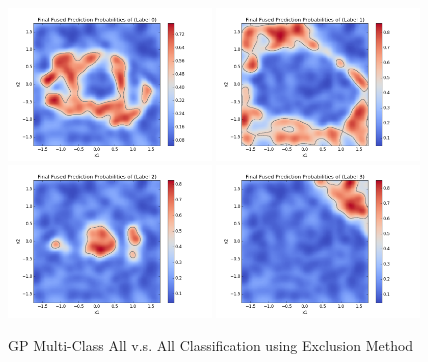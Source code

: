 				\begin{figure}[!htbp]
					\centering
						\includegraphics[width=0.48\textwidth]{Figures/Progress/exclusionAVA/Figure5.png}
						\includegraphics[width=0.48\textwidth]{Figures/Progress/exclusionAVA/Figure6.png}
						\includegraphics[width=0.48\textwidth]{Figures/Progress/exclusionAVA/Figure7.png}
						\includegraphics[width=0.48\textwidth]{Figures/Progress/exclusionAVA/Figure8.png}
					\caption{GP Multi-Class All v.s. All Classification using Exclusion Method}
					\label{ProgressReport:GaussianProcessModels:Figure:exclusionAVA2}
				\end{figure}
				
